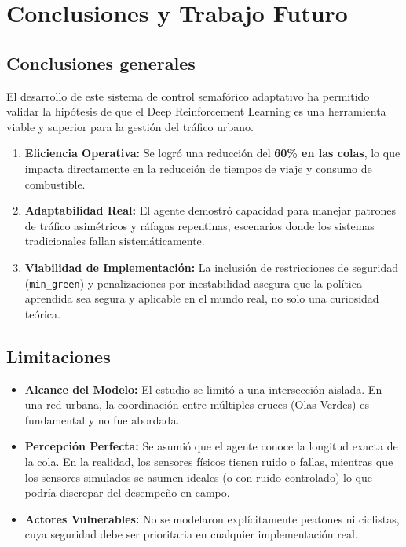 \documentclass[12pt, a4paper]{report}
\begin{document}
\chapter{Conclusiones y Trabajo Futuro}

\section{Conclusiones generales}
El desarrollo de este sistema de control semafórico adaptativo ha permitido validar la hipótesis de que el Deep Reinforcement Learning es una herramienta viable y superior para la gestión del tráfico urbano.

\begin{enumerate}
    \item \textbf{Eficiencia Operativa:} Se logró una reducción del \textbf{60\% en las colas}, lo que impacta directamente en la reducción de tiempos de viaje y consumo de combustible.
    \item \textbf{Adaptabilidad Real:} El agente demostró capacidad para manejar patrones de tráfico asimétricos y ráfagas repentinas, escenarios donde los sistemas tradicionales fallan sistemáticamente.
    \item \textbf{Viabilidad de Implementación:} La inclusión de restricciones de seguridad (\texttt{min\_green}) y penalizaciones por inestabilidad asegura que la política aprendida sea segura y aplicable en el mundo real, no solo una curiosidad teórica.
\end{enumerate}

\section{Limitaciones}
\begin{itemize}
    \item \textbf{Alcance del Modelo:} El estudio se limitó a una intersección aislada. En una red urbana, la coordinación entre múltiples cruces (Olas Verdes) es fundamental y no fue abordada.
    \item \textbf{Percepción Perfecta:} Se asumió que el agente conoce la longitud exacta de la cola. En la realidad, los sensores físicos tienen ruido o fallas, mientras que los sensores simulados se asumen ideales (o con ruido controlado) lo que podría discrepar del desempeño en campo.
    \item \textbf{Actores Vulnerables:} No se modelaron explícitamente peatones ni ciclistas, cuya seguridad debe ser prioritaria en cualquier implementación real.
\end{itemize}
\end{document}
